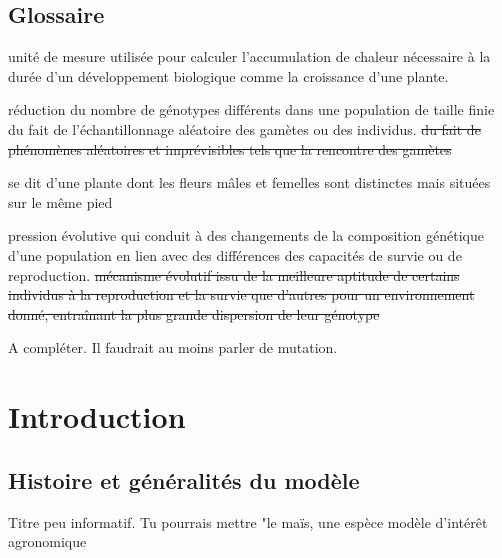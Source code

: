 \documentclass[12pt,a4paper]{report}
\newcommand{\com}[1]{{\noindent  \color{red}#1}}
\begin{document}
	\tableofcontents
	\listoffigures
	\newpage
	
	\section*{Glossaire}
		\begin{description}
			
			\item [Degré-jour :] \com{unité de } mesure utilisée pour calculer l'accumulation de chaleur nécessaire à la durée d'un développement biologique comme la croissance d'une plante\com{.}
			
			\item [Dérive génétique :] réduction du nombre de génotypes \com{différents} dans une population \com{de taille finie du fait de l'échantillonnage aléatoire des gamètes ou des individus.} \sout{du fait de phénomènes aléatoires et imprévisibles tels que la rencontre des gamètes}
			
			\item [Monoïque :] se dit d'une plante dont les fleurs mâles et femelles sont distinctes mais situées sur le même pied
			
			\item [Sélection naturelle :] \com{pression évolutive qui conduit à des changements de la composition génétique d'une population en lien avec des différences des capacités de survie ou de reproduction.} \sout{mécanisme évolutif issu de la meilleure aptitude de certains individus à la reproduction et la survie que d'autres pour un environnement donné, entraînant la plus grande dispersion de leur génotype}
			
			\item \com{A compléter. Il faudrait au moins parler de mutation.}		
			
		\end{description}
		 
	
	\chapter{Introduction}
		\section{Histoire et généralités du modèle}

\com{Titre peu informatif. Tu pourrais mettre "le ma\"is, une espèce modèle d'intér\^et agronomique }
\end{document}
